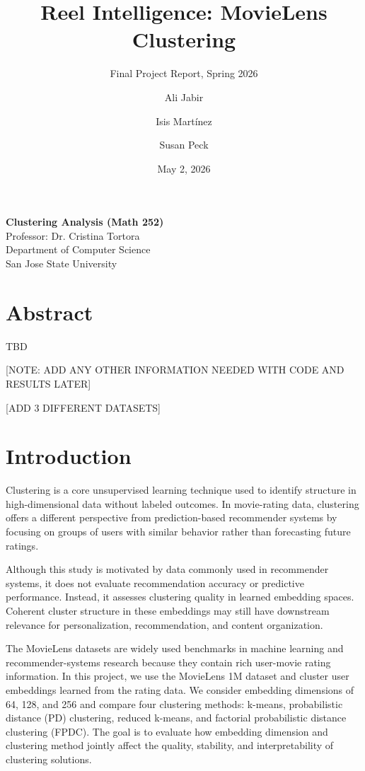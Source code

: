 \documentclass[
  11pt,
]{article}
\title{Reel Intelligence: MovieLens Clustering}
\subtitle{Final Project Report, Spring 2026}
\author{Ali Jabir \and Isis Martínez \and Susan Peck}
\date{May 2, 2026}
\begin{document}
\maketitle

\begin{center}
\textbf{Clustering Analysis (Math 252)}\\
Professor: Dr. Cristina Tortora\\
Department of Computer Science\\
San Jose State University
\end{center}

\section{Abstract}\label{abstract}

TBD

{[}NOTE: ADD ANY OTHER INFORMATION NEEDED WITH CODE AND RESULTS LATER{]}

{[}ADD 3 DIFFERENT DATASETS{]}

\section{Introduction}\label{introduction}

Clustering is a core unsupervised learning technique used to identify
structure in high-dimensional data without labeled outcomes. In
movie-rating data, clustering offers a different perspective from
prediction-based recommender systems by focusing on groups of users with
similar behavior rather than forecasting future ratings.

Although this study is motivated by data commonly used in recommender
systems, it does not evaluate recommendation accuracy or predictive
performance. Instead, it assesses clustering quality in learned
embedding spaces. Coherent cluster structure in these embeddings may
still have downstream relevance for personalization, recommendation, and
content organization.

The MovieLens datasets are widely used benchmarks in machine learning
and recommender-systems research because they contain rich user-movie
rating information. In this project, we use the MovieLens 1M dataset and
cluster user embeddings learned from the rating data. We consider
embedding dimensions of 64, 128, and 256 and compare four clustering
methods: k-means, probabilistic distance (PD) clustering, reduced
k-means, and factorial probabilistic distance clustering (FPDC). The
goal is to evaluate how embedding dimension and clustering method
jointly affect the quality, stability, and interpretability of
clustering solutions.
\end{document}
